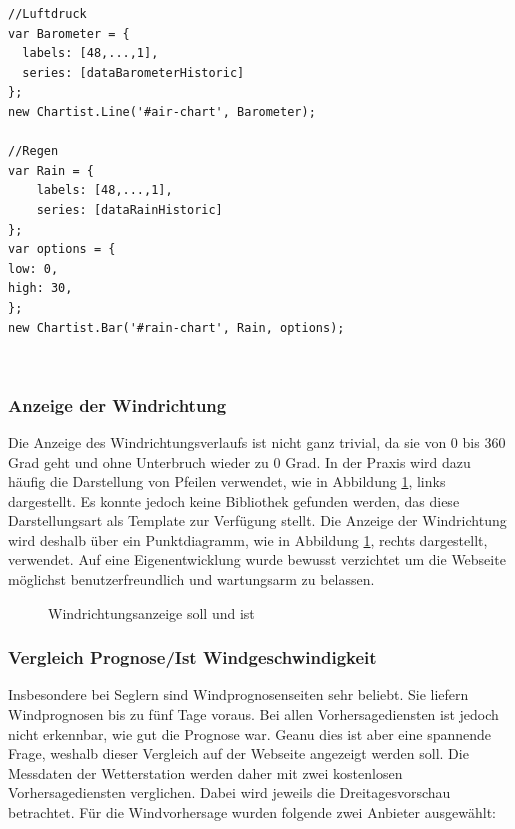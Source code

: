 \begin{lstlisting}[label=lst:charts,caption=Konfiguration der Verlaufsdiagramme, language=HTML5, style=htmlcssjs]
//Luftdruck
var Barometer = {
  labels: [48,...,1],
  series: [dataBarometerHistoric]
};
new Chartist.Line('#air-chart', Barometer);

//Regen
var Rain = {
	labels: [48,...,1],
	series: [dataRainHistoric]
};
var options = {
low: 0,
high: 30,
};
new Chartist.Bar('#rain-chart', Rain, options);
\end{lstlisting}
\ \\





\subsubsection{Anzeige der Windrichtung}
Die Anzeige des Windrichtungsverlaufs ist nicht ganz trivial, da sie von 0 bis 360 Grad geht und ohne Unterbruch wieder zu 0 Grad. In der Praxis wird dazu häufig die Darstellung von Pfeilen verwendet, wie in Abbildung \ref{img:windrichtung}, links dargestellt. Es konnte jedoch keine Bibliothek gefunden werden, das diese Darstellungsart als Template zur Verfügung stellt. Die Anzeige der Windrichtung wird deshalb über ein Punktdiagramm, wie in Abbildung \ref{img:windrichtung}, rechts dargestellt, verwendet. Auf eine Eigenentwicklung wurde bewusst verzichtet um die Webseite möglichst benutzerfreundlich und wartungsarm zu belassen.

\begin{figure}[htbp!]
	\centering
	\caption{Windrichtungsanzeige soll und ist}
	\label{img:windrichtung}
\end{figure}

\subsubsection{Vergleich Prognose/Ist Windgeschwindigkeit}
Insbesondere bei Seglern sind Windprognosenseiten sehr beliebt. Sie liefern Windprognosen bis zu fünf Tage voraus. Bei allen Vorhersagediensten ist jedoch nicht erkennbar, wie gut die Prognose war. Geanu dies ist aber eine spannende Frage, weshalb dieser Vergleich auf der Webseite angezeigt werden soll. Die Messdaten der Wetterstation werden daher mit zwei kostenlosen Vorhersagediensten verglichen. Dabei wird jeweils die Dreitagesvorschau betrachtet. Für die Windvorhersage wurden folgende zwei Anbieter ausgewählt:

